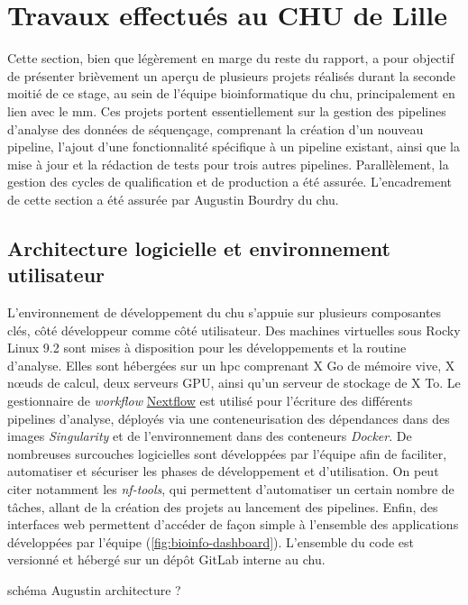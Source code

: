 \chapter{Travaux effectués au CHU de Lille}

Cette section, bien que légèrement en marge du reste du rapport, a pour objectif de présenter brièvement un aperçu 
de plusieurs projets réalisés durant la seconde moitié de ce stage, au sein de l'équipe bioinformatique du \gls{chu}, 
principalement en lien avec le \gls{mm}. Ces projets portent essentiellement sur la gestion des pipelines d'analyse 
des données de séquençage, comprenant la création d'un nouveau pipeline, l'ajout d'une fonctionnalité spécifique à 
un pipeline existant, ainsi que la mise à jour et la rédaction de tests pour trois autres pipelines. Parallèlement, 
la gestion des cycles de qualification et de production a été assurée. L'encadrement de cette section a été assurée par 
Augustin Bourdry du \gls{chu}.

\section{Architecture logicielle et environnement utilisateur}

L'environnement de développement du \gls{chu} s'appuie sur plusieurs composantes clés, côté développeur comme côté utilisateur.
Des machines virtuelles sous Rocky Linux 9.2 sont mises à disposition pour les développements et la routine d'analyse.
Elles sont hébergées sur un \gls{hpc} comprenant X Go de mémoire vive, X nœuds de calcul, deux serveurs GPU, ainsi qu'un serveur de stockage de X To.
Le gestionnaire de \textit{workflow} \href{https://www.nextflow.io/}{Nextflow} est utilisé pour l'écriture des différents pipelines d'analyse, 
déployés via une conteneurisation des dépendances dans des images \textit{Singularity} et de l'environnement dans des conteneurs \textit{Docker}.
De nombreuses surcouches logicielles sont développées par l'équipe afin de faciliter, automatiser et sécuriser les phases de développement et d'utilisation.
On peut citer notamment les \textit{nf-tools}, qui permettent d'automatiser un certain nombre de tâches, allant de la création des projets au lancement des pipelines.
Enfin, des interfaces web permettent d'accéder de façon simple à l'ensemble des applications développées par l'équipe (\autoref{fig:bioinfo-dashboard}).
L'ensemble du code est versionné et hébergé sur un dépôt GitLab interne au \gls{chu}.

schéma Augustin architecture ? 

